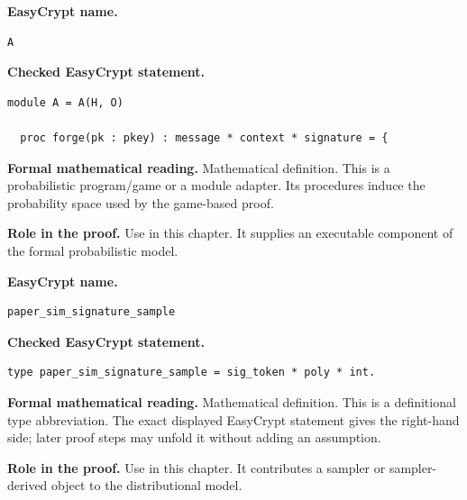 \begin{formaldefinition}
\noindent\textbf{EasyCrypt name.}
\begin{lstlisting}[language=EasyCrypt,basicstyle=\ttfamily\scriptsize]
A
\end{lstlisting}
\noindent\textbf{Checked EasyCrypt statement.}
\begin{lstlisting}[language=EasyCrypt,basicstyle=\ttfamily\scriptsize]
module A = A(H, O)

  proc forge(pk : pkey) : message * context * signature = {
\end{lstlisting}
\noindent\textbf{Formal mathematical reading.}
Mathematical definition. This is a probabilistic program/game or a module adapter.  Its procedures induce the probability space used by the game-based proof.

\noindent\textbf{Role in the proof.}
Use in this chapter. It supplies an executable component of the formal probabilistic model.

\end{formaldefinition}

\begin{formaldefinition}
\noindent\textbf{EasyCrypt name.}
\begin{lstlisting}[language=EasyCrypt,basicstyle=\ttfamily\scriptsize]
paper_sim_signature_sample
\end{lstlisting}
\noindent\textbf{Checked EasyCrypt statement.}
\begin{lstlisting}[language=EasyCrypt,basicstyle=\ttfamily\scriptsize]
type paper_sim_signature_sample = sig_token * poly * int.
\end{lstlisting}
\noindent\textbf{Formal mathematical reading.}
Mathematical definition. This is a definitional type abbreviation.  The exact displayed EasyCrypt statement gives the right-hand side; later proof steps may unfold it without adding an assumption.

\noindent\textbf{Role in the proof.}
Use in this chapter. It contributes a sampler or sampler-derived object to the distributional model.

\end{formaldefinition}

